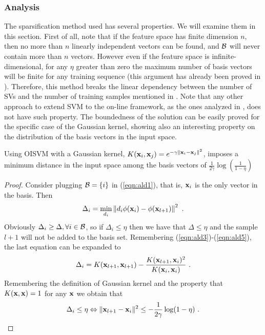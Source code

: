 \subsubsection{Analysis}
The sparsification method used has several properties. We will examine them in this section.
First of all, note that if the feature space has finite dimension $n$, then no more than
$n$ linearly independent vectors can be found, and $\mathcal{B}$ will never contain
more than $n$ vectors. However even if the feature space is infinite-dimensional,
for any $\eta$ greater than zero the maximum number of basis vectors will be
finite for any training sequence (this argument has already been proved in
\cite{EngelMM04}). Therefore, this method breaks the linear dependency
between the number of SVs and the number of training samples mentioned
in \cite{Steinwart03}. Note that any other approach to extend SVM to the on-line
framework, as the ones analyzed in \cite{DomeniconiG01}, does not have such
property.
The boundedness of the solution can be easily proved for the specific case
of the Gaussian kernel, showing also an interesting property on the distribution
of the basis vectors in the input space.
\begin{teorema}
Using OISVM with a Gaussian kernel, $K(\mathbf{x}_i,\mathbf{x}_j)=e^{-\gamma \| \mathbf{x}_{i}-\mathbf{x}_{j} \|^2}$,
imposes a minimum distance in the input space
among the basis vectors of $\frac{1}{2\gamma}\log(\frac{1}{1-\eta})$
\end{teorema}
\begin{proof}
Consider plugging $\mathcal{B}=\left\{ i \right\}$ in (\ref{eqn:ald1}), that is,
$\mathbf{x}_i$ is the only vector in the basis. Then
%
\begin{equation} \label{eqn:ald_single}
  \Delta_i = \min_{d_i} \left\| d_i \phi(\mathbf{x}_i) - \phi(\mathbf{x}_{l+1}) \right\|^2~.
\end{equation}
%
Obviously $\Delta_i \geq \Delta, \forall i \in \mathcal{B}$, so if $\Delta_i
\leq \eta$ then we have that $\Delta \leq \eta$ and the sample $l+1$
will not be added to the basis set. Remembering
(\ref{eqn:ald3})-(\ref{eqn:ald5}), the last equation can be expanded to
%
\begin{equation} \label{eqn:ald_single2}
  \Delta_i = K(\mathbf{x}_{l+1},\mathbf{x}_{l+1}) - \frac{K(\mathbf{x}_{l+1},\mathbf{x}_{i})^2}{K(\mathbf{x}_{i},\mathbf{x}_{i})}~.
\end{equation}
%
Remembering the definition of Gaussian kernel and the property that $K(\mathbf{x},\mathbf{x})=1$ for any $\mathbf{x}$
we obtain that
%
\begin{align*}
	\Delta_i \leq \eta \Leftrightarrow \| \mathbf{x}_{l+1}-\mathbf{x}_{i} \|^2  \leq -\frac{1}{2\gamma}\log(1-\eta)~.
\end{align*}
\end{proof}

